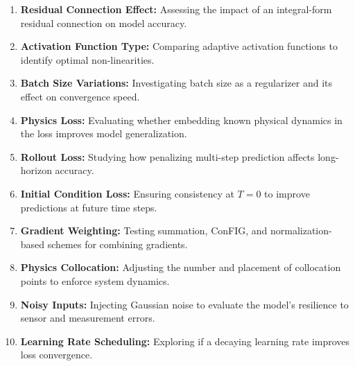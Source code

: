 \documentclass[conference]{IEEEtran}
\begin{document}
{\begin{enumerate}
    \item \textbf{Residual Connection Effect:} 
        Assessing the impact of an integral-form residual connection on model accuracy.
    
    \item \textbf{Activation Function Type:} 
        Comparing adaptive activation functions to identify optimal non-linearities.
    
    \item \textbf{Batch Size Variations:}
    Investigating batch size as a regularizer and its effect on convergence speed.
    
    \item \textbf{Physics Loss:} 
        Evaluating whether embedding known physical dynamics in the loss improves model generalization.
    
    \item \textbf{Rollout Loss:}
    Studying how penalizing multi-step prediction affects long-horizon accuracy.
    
    \item \textbf{Initial Condition Loss:}
        Ensuring consistency at $T=0$ to improve predictions at future time steps.
    
    
    \item \textbf{Gradient Weighting:}
        Testing summation, ConFIG, and normalization-based schemes for combining gradients.
    
    \item \textbf{Physics Collocation:}
    Adjusting the number and placement of collocation points to enforce system dynamics.
    
    \item \textbf{Noisy Inputs:}
    Injecting Gaussian noise to evaluate the model’s resilience to sensor and measurement errors.
    
    \item \textbf{Learning Rate Scheduling:}
    Exploring if a decaying learning rate improves loss convergence.
    
\end{enumerate}

}
\end{document}
